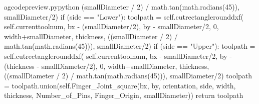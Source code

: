 \documentclass{ltxdoc}
\begin{document}
\begin{writecode}{a}{gcodepreview.py}{python}
                    (smallDiameter / 2) / math.tan(math.radians(45)), 
                    smallDiameter/2)
            if (side == "Lower"):
                toolpath = self.cutrectanglerounddxf(
                    self.currenttoolnum, 
                    bx - (smallDiameter/2), 
                    by - smallDiameter/2, 
                    0, 
                    width+smallDiameter, 
                    thickness, 
                    ((smallDiameter / 2) / math.tan(math.radians(45))), 
                    smallDiameter/2)
            if (side == "Upper"):
                toolpath = self.cutrectanglerounddxf(
                    self.currenttoolnum, 
                    bx - smallDiameter/2, 
                    by - (thickness - smallDiameter/2), 
                    0, 
                    width+smallDiameter, 
                    thickness, 
                    ((smallDiameter / 2) / math.tan(math.radians(45))), 
                    smallDiameter/2)
        toolpath = toolpath.union(self.Finger_Joint_square(bx, by, orientation, side, width, thickness, Number_of_Pins, Finger_Origin, smallDiameter))
        return toolpath


\end{writecode}
\end{document}
